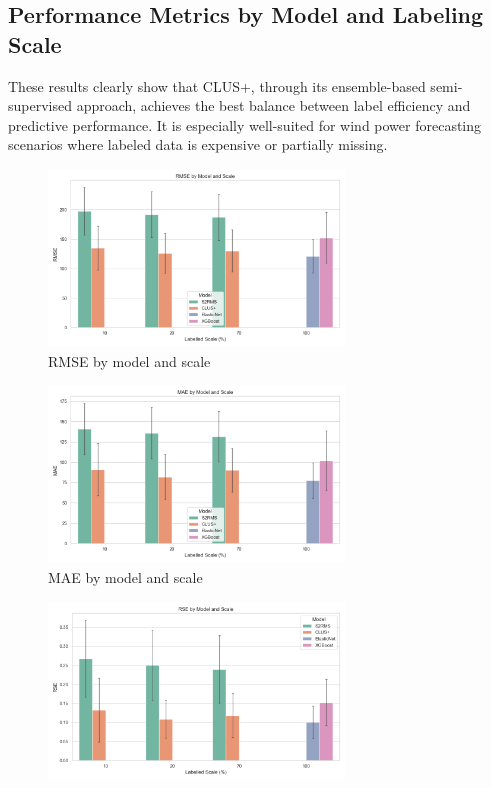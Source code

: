 \documentclass{article}
\begin{document}
\begin{appendices}
\section{Performance Metrics by Model and Labeling Scale}
\label{sec:appendix_metrics}
These results clearly show that CLUS+, through its ensemble-based semi-supervised approach, achieves the best balance between label efficiency and predictive performance. It is especially well-suited for wind power forecasting scenarios where labeled data is expensive or partially missing.

\begin{figure}[!ht]
    \centering
    \includegraphics[width=0.7\textwidth]{figures/rmse_by_model_and_scale.png}
    \caption{RMSE by model and scale}
    \label{fig:rmse}
\end{figure}
\begin{figure}[!ht]
    \centering
    \includegraphics[width=0.7\textwidth]{figures/mae_by_model_and_scale.png}
    \caption{MAE by model and scale}
    \label{fig:mae}
\end{figure}
\begin{figure}[!ht]
    \centering
    \includegraphics[width=0.7\textwidth]{figures/rse_by_model_and_scale.png}

\end{figure}
\end{appendices}
\end{document}
